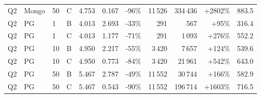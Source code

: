 \begin{longtable}{@{}lllllrrrrrr@{}}
Q2 & Mongo & 50 & C & 4.753 & 0.167 & -96\% & 11\,526 & 334\,436 & +2802\% & 883.5 \\
Q2 & PG & 1 & B & 4.013 & 2.693 & -33\% & 291 & 567 & +95\% & 316.4 \\
Q2 & PG & 1 & C & 4.013 & 1.177 & -71\% & 291 & 1\,093 & +276\% & 552.2 \\
Q2 & PG & 10 & B & 4.950 & 2.217 & -55\% & 3\,420 & 7\,657 & +124\% & 539.6 \\
Q2 & PG & 10 & C & 4.950 & 0.773 & -84\% & 3\,420 & 21\,961 & +542\% & 643.0 \\
Q2 & PG & 50 & B & 5.467 & 2.787 & -49\% & 11\,552 & 30\,744 & +166\% & 582.9 \\
Q2 & PG & 50 & C & 5.467 & 0.543 & -90\% & 11\,552 & 196\,714 & +1603\% & 716.5 \\
\end{longtable}
